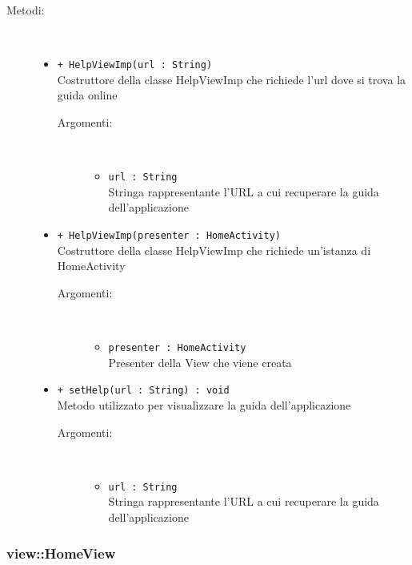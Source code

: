 \documentclass[../DefinizioneDiProdotto.tex]{subfiles}
\begin{document}
\begin{description}
\begin{itemize}
\end{itemize}
\item[Metodi:] \
\begin{itemize}
\item \texttt{+ HelpViewImp(url : String)}\\
Costruttore della classe HelpViewImp che richiede l'url dove si trova la guida online
 \begin{description}
\item[Argomenti:] \
\begin{itemize}
\item \texttt{url : String}\\
Stringa rappresentante l'URL a cui recuperare la guida dell'applicazione\end{itemize}
\end{description}
\item \texttt{+ HelpViewImp(presenter : HomeActivity)}\\
Costruttore della classe HelpViewImp che richiede un'istanza di HomeActivity
 \begin{description}
\item[Argomenti:] \
\begin{itemize}
\item \texttt{presenter : HomeActivity}\\
Presenter della View che viene creata\end{itemize}
\end{description}
\item \texttt{+ setHelp(url : String) : void}\\
Metodo utilizzato per visualizzare la guida dell'applicazione
 \begin{description}
\item[Argomenti:] \
\begin{itemize}
\item \texttt{url : String}\\
Stringa rappresentante l'URL a cui recuperare la guida dell'applicazione\end{itemize}
\end{description}
\end{itemize}
\end{description}

\subsubsection{view::HomeView}
\end{document}
